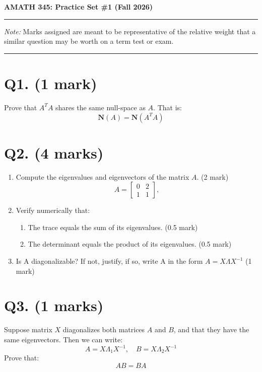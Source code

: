 \documentclass[11pt]{article}
\begin{document}
\begin{center}
    {\Large \textbf{AMATH 345: Practice Set \#1 (Fall 2026)} } \\
    \vspace{0.3cm}
\end{center}

\hrule
\vspace{0.5em}

\emph{Note:} Marks assigned are meant to be representative of the relative weight that a similar question may be worth on a term test or exam.

\vspace{0.5em}
\hrule

\vspace{1cm}
\section*{Q1. (1 mark)}

Prove that \( A^TA\) shares the same null-space as \(A\). That is:
\[
\mathbf{N}(A) = \mathbf{N}(A^TA) 
\]

\section*{Q2. (4 marks)}


\begin{enumerate}
    \item Compute the eigenvalues and eigenvectors of the matrix \(A\). (2 mark)
\[
A=\begin{bmatrix}0 & 2 \\ 1 & 1\end{bmatrix},
\] 

    \item Verify numerically that:
    \begin{enumerate}
        \item The trace equals the sum of its eigenvalues. (0.5 mark)
        \item The determinant equals the product of its eigenvalues. (0.5 mark)
    \end{enumerate}

    \item Is A diagonalizable? If not, justify, if so, write A in the form \(A = X\Lambda X^{-1}\) (1 mark)
\end{enumerate}

\section*{Q3. (1 marks)}
 Suppose matrix \(X\) diagonalizes both matrices \(A\) and \(B\), and that they have the same eigenvectors. Then we  can write:
\[
A = X\Lambda_1 X^{-1} ,\quad B = X \Lambda_2 X^{-1}
\]
Prove that:
\[
AB = BA
\]
\end{document}
